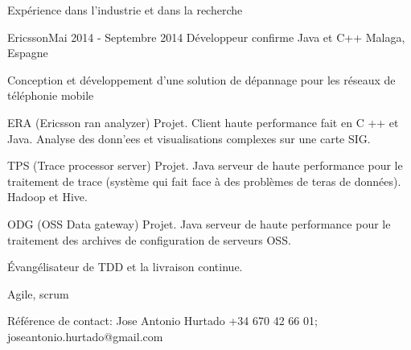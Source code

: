 \documentclass{resume} %
\begin{document}
\begin{rSection}{Exp\'{e}rience dans l'industrie et dans la recherche}

\begin{rSubsection}{Ericsson}{Mai 2014 - Septembre 2014 }{ D\'{e}veloppeur confirme Java et C++  }{Malaga, Espagne}
	\item Conception et d\'{e}veloppement d'une solution de d\'{e}pannage pour les r\'{e}seaux de t\'{e}l\'{e}phonie mobile
	\item ERA (Ericsson ran analyzer) Projet. Client haute performance fait en C ++ et Java. Analyse des donn'{e}es et visualisations complexes sur une carte SIG.
	\item TPS (Trace processor server) Projet. Java serveur de haute performance pour le traitement de trace (syst\`{e}me qui fait face \`{a} des probl\`{e}mes de teras de donn\'{e}es). Hadoop et Hive.
	\item ODG (OSS Data gateway) Projet. Java serveur de haute performance pour le traitement des archives de configuration de serveurs OSS.
	\item \'{E}vang\'{e}lisateur de TDD et la livraison continue.
	\item Agile, scrum
	\item R\'{e}f\'{e}rence de contact: Jose Antonio Hurtado +34 670 42 66 01; joseantonio.hurtado@gmail.com
	
\end{rSubsection}



\end{rSection}
\end{document}
